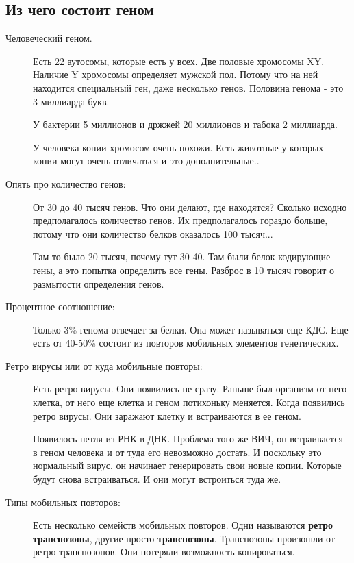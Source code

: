 \subsection{Из чего состоит геном}
\begin{description}
\item[Человеческий геном.] 

Есть 22 аутосомы, которые есть у всех. 
Две половые хромосомы XY.
Наличие Y хромосомы определяет мужской пол. Потому что на ней находится
специальный ген, даже несколько генов. Половина генома - это 3 миллиарда букв.

У бактерии 5 миллионов и држжей 20 миллионов и табока 2 миллиарда.

У человека копии хромосом очень похожи. Есть животные у которых копии
могут очень отличаться и это дополнительные..

\item[Опять про количество генов:]
От 30 до 40 тысяч генов. Что они делают, где находятся?
Сколько исходно предполагалось количество генов. Их
предполагалось гораздо больше, потому что они количество белков
оказалось 100 тысяч...

Там то было 20 тысяч, почему тут 30-40. Там были белок-кодирующие
гены, а это попытка определить все гены. Разброс в 10 тысяч говорит
о размытости определения генов. 

\item[Процентное соотношение:]
Только 3\% генома отвечает
за белки. Она может называться еще \TODO КДС. Еще
есть от 40-50\% состоит из повторов мобильных
элементов генетических.

\item[Ретро вирусы или от куда мобильные повторы:]
Есть ретро вирусы. Они появились не сразу. Раньше 
был организм от него клетка, 
от него еще клетка и геном потихоньку меняется. Когда 
появились ретро вирусы. Они заражают клетку и встраиваются в ее геном. 

Появилось петля из РНК в ДНК. Проблема того же ВИЧ, он встраивается 
в геном человека и от туда его невозможно достать. И поскольку это нормальный 
вирус, он начинает генерировать свои новые копии. Которые будут снова встраиваться. 
И они могут встроиться туда же. 

\item[Типы мобильных повторов:]
Есть несколько семейств мобильных повторов. Одни называются \textbf{ретро транспозоны}, 
другие просто \textbf{транспозоны}. Транспозоны произошли от 
ретро транспозонов. Они потеряли возможность копироваться. 


\end{description}
